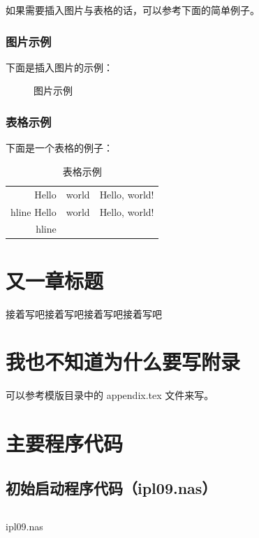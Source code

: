 \documentclass{swfcthesis}
\begin{document}
如果需要插入图片与表格的话，可以参考下面的简单例子。

\subsection{图片示例}

下面是插入图片的示例：

\begin{figure}[!ht]
  \centering
  \caption{图片示例}
  \label{fig:hello}
\end{figure}

\subsection{表格示例}

下面是一个表格的例子：

\begin{table}[!ht]
  \centering
  \begin{tabular}{|r|c|l|}    \hline
    Hello&world&Hello, world!\\hline
    Hello&world&Hello, world!\\hline
  \end{tabular}
  \caption{表格示例}
\end{table}

\chapter{又一章标题}

接着写吧接着写吧接着写吧接着写吧


\Appendix{}
\printbibliography[heading={bibintoc},title={参考文献}] %
\advisorinfopage{}                 %
\acknowledgmentspage{}             %


\chapter{我也不知道为什么要写附录} %

可以参考模版目录中的 appendix.tex 文件来写。

\chapter{主要程序代码} %

\section{初始启动程序代码（ipl09.nas）}

\begin{listing}[H]
  \inputminted[tabsize=2, 
  linenos=true]{c}{../ZOS/src/kernel/ipl09.nas}
  \caption{ipl09.nas}
  \label{sec:ipl09.nas}
\end{listing}
\end{document}
